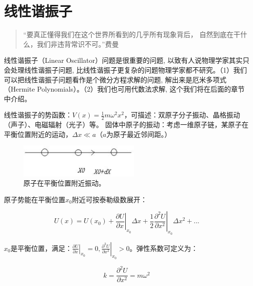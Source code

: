 \section{线性谐振子}\label{section linear oscillator}



\begin{quotation}
``要真正懂得我们在这个世界所看到的几乎所有现象背后，
自然到底在干什么，我们非违背常识不可。''\qquad 费曼
\end{quotation}


线性谐振子（Linear Oscillator）问题是很重要的问题,
以致有人说物理学家其实只会处理线性谐振子问题,
比线性谐振子更复杂的问题物理学家都不研究。（1）我们可以把线性谐振子问题看作是个微分方程求解的问题,
解出来是厄米多项式（Hermite
Polynomials）。（2）我们也可用代数法求解,
这个我们将在后面的章节中介绍。

线性谐振子的势函数：$V(x) = \frac{1}{2}m\omega ^2 x^2
$，可描述：双原子分子振动、晶格振动（声子）、电磁辐射（光子）等。
固体中原子的振动：考虑一维原子链，某原子在平衡位置附近的运动，$\Delta
x \ll a$（$a$为原子最近邻间距。）


\begin{figure}[h]
\begin{center}
\includegraphics[clip,width=6cm]{1DProblem/10-1.ps}
\caption{原子在平衡位置附近振动。}
\end{center}
\end{figure}


原子势能在平衡位置$x_0$附近可按泰勒级数展开：

\begin{equation}
U(x) = U(x_0 ) + \left. {\frac{{\partial U}}{{\partial x}}} \right|_{x_0 } \Delta x + \left. {\frac{1}{2}\frac{{\partial ^2 U}}{{\partial x^2 }}} \right|_{x_0 } \Delta x^2  + ...
\end{equation}

$x_0$是平衡位置，满足：$\left. {\frac{{\partial U}}{{\partial x}}} \right|_{x_0 }  = 0,\left. {\frac{{\partial ^2 U}}{{\partial x^2 }}} \right|_{x_0 }  > 0$。弹性系数可定义为：

\begin{equation}
k = \frac{{\partial ^2 U}}{{\partial x^2 }} = m\omega ^2 
\end{equation}

